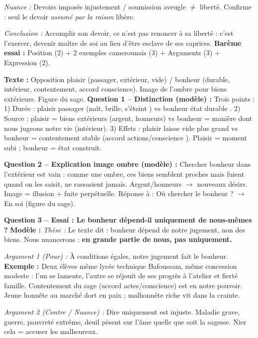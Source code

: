 \documentclass[11pt]{article}
\begin{document}
\begin{exoresolu}
\textit{Nuance :} Devoirs imposés injustement / soumission aveugle $\neq$ liberté. Confirme : seul le devoir \emph{assumé par la raison} libère.

\textit{Conclusion :} Accomplir son devoir, ce n'est pas renoncer à sa liberté : c'est l'exercer, devenir maître de soi au lieu d'être esclave de ses caprices.
\textbf{Barème essai :} Position (2) + 2 exemples camerounais (3) + Arguments (3) + Expression (2).
\end{exoresolu}

\begin{exoresolu}
\textbf{Texte :} Opposition plaisir (passager, extérieur, vide) / bonheur (durable, intérieur, contentement, accord conscience). Image de l'ombre pour biens extérieurs. Figure du sage.
\tcblower
\textbf{Question 1 -- Distinction (modèle) :} Trois points : 1) Durée : plaisir \og passager \fg (\og naît, brille, s'éteint \fg) vs bonheur \og état durable \fg. 2) Source : plaisir = biens extérieurs (argent, honneurs) vs bonheur = \og manière dont nous jugeons notre vie \fg (intérieur). 3) Effets : plaisir laisse \og vide plus grand \fg vs bonheur = \og contentement \fg stable (\og accord actions/conscience \fg). Plaisir = moment subi ; bonheur = état construit.

\textbf{Question 2 -- Explication image ombre (modèle) :} Chercher bonheur dans l'extérieur est vain : comme une ombre, ces biens semblent proches mais fuient quand on les saisit, ne rassasient jamais. Argent/honneurs $\rightarrow$ nouveaux désirs. Image = illusion + fuite perpétuelle. Réponse à : \og Où chercher le bonheur ? \fg $\rightarrow$ En soi (figure du sage).

\textbf{Question 3 -- Essai : \og Le bonheur dépend-il uniquement de nous-mêmes ? \fg}
\textbf{Modèle :}
\textit{Thèse :} Le texte dit : bonheur dépend de notre jugement, non des biens. Nous nuancerons : \textbf{en grande partie de nous, pas uniquement.}

\textit{Argument 1 (Pour) :} À conditions égales, notre jugement fait le bonheur. \textbf{Exemple :} Deux élèves même lycée technique Bafoussam, même concession modeste : l'un se lamente, l'autre se réjouit de ses progrès à l'atelier et fierté famille. Contentement du sage (accord actes/conscience) est en notre pouvoir. Jeune honnête au marché dort en paix ; malhonnête riche vit dans la crainte.

\textit{Argument 2 (Contre / Nuance) :} Dire \og uniquement \fg est injuste. Maladie grave, guerre, pauvreté extrême, deuil pèsent sur l'âme quelle que soit la sagesse. Nier cela = accuser les malheureux.


\end{exoresolu}
\end{document}
